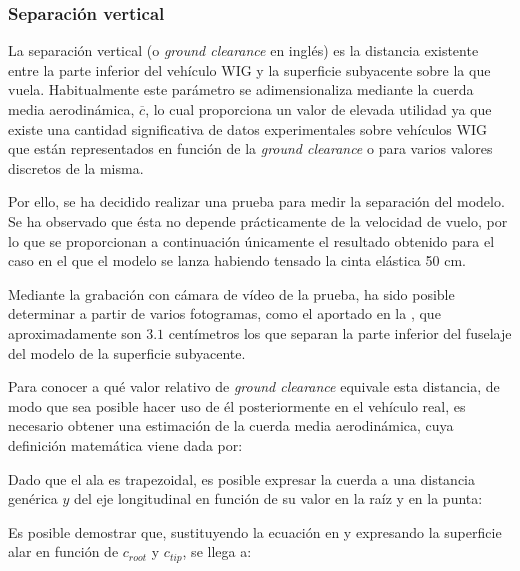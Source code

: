 \subsubsection{Separación vertical}
\label{sec:tests:results:clearance}

La separación vertical (o \emph{ground clearance} en inglés) es la distancia existente entre la parte inferior del vehículo WIG y la superficie subyacente sobre la que vuela. Habitualmente este parámetro se adimensionaliza mediante la cuerda media aerodinámica, $\overline{c}$, lo cual proporciona un valor de elevada utilidad ya que existe una cantidad significativa de datos experimentales sobre vehículos WIG que están representados en función de la \emph{ground clearance} o para varios valores discretos de la misma.

Por ello, se ha decidido realizar una prueba para medir la separación del modelo. Se ha observado que ésta no depende prácticamente de la velocidad de vuelo, por lo que se proporcionan a continuación únicamente el resultado obtenido para el caso en el que el modelo se lanza habiendo tensado la cinta elástica 50 cm.

Mediante la grabación con cámara de vídeo de la prueba, ha sido posible determinar a partir de varios fotogramas, como el aportado en la , que aproximadamente son $3.1$ centímetros los que separan la parte inferior del fuselaje del modelo de la superficie subyacente.


Para conocer a qué valor relativo de \emph{ground clearance} equivale esta distancia, de modo que sea posible hacer uso de él posteriormente en el vehículo real, es necesario obtener una estimación de la cuerda media aerodinámica, cuya definición matemática viene dada por:

Dado que el ala es trapezoidal, es posible expresar la cuerda a una distancia genérica $y$ del eje longitudinal en función de su valor en la raíz y en la punta:

Es posible demostrar que, sustituyendo la ecuación  en  y expresando la superficie alar en función de $c_{root}$ y $c_{tip}$, se llega a:

